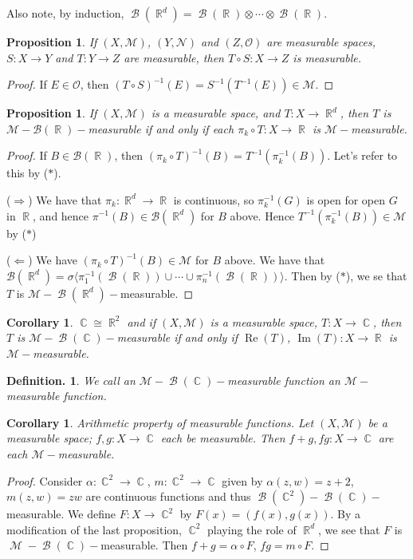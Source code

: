 \documentclass[12pt, a4paper]{memoir}
\DeclareMathOperator{\R}{{\mathbb{R}}}
\DeclareMathOperator{\C}{{\mathbb{C}}}
\newtheorem{corollary}[theorem]{Corollary}
\newtheorem{proposition}[theorem]{Proposition}
\theoremstyle{nonumberplain}
\newtheorem{definition}{Definition.}
\newtheorem{proof}{Proof}
\DeclareMathOperator{\M}{\mathcal{M}}
\DeclareMathOperator{\B}{\mathcal{B}}
\renewcommand{\Re}{\ensuremath{\operatorname{Re}}}
\renewcommand{\Im}{\ensuremath{\operatorname{Im}}}
\begin{document}
Also note, by induction, $\B(\R^d)=\B(\R)\otimes\cdots\otimes\B(\R)$.
\begin{proposition}
    If $(X,\mathcal{M})$, $(Y,\mathcal{N})$ and $(Z,\mathcal{O})$ are measurable spaces, $S:X\to Y$ and $T:Y\to Z$ are measurable, then $T\circ S:X\to Z$ is measurable.
\end{proposition}
\begin{proof}
    If $E\in\mathcal{O}$, then $(T\circ S)^{-1}(E)=S^{-1}(T^{-1}(E))\in\mathcal{M}$.
\end{proof}
\begin{proposition}
    If $(X,\mathcal{M})$ is a measurable space, and $T:X\to\R^d$, then $T$ is $\mathcal{M}-\mathcal{B}(\R)-$measurable if and only if each $\pi_k\circ T:X\to\R$ is $\mathcal{M}-$measurable.
\end{proposition}
\begin{proof}
    If $B\in\mathcal{B}(\R)$, then $(\pi_k\circ T)^{-1}(B)=T^{-1}(\pi_k^{-1}(B))$.
    Let's refer to this by ($*$).

    ($\Rightarrow$) We have that $\pi_k:\R^d\to\R$ is continuous, so $\pi_k^{-1}(G)$ is open for open $G$ in $\R$, and hence $\pi^{-1}(B)\in\mathcal{B}(\R^d)$ for $B$ above.
    Hence $T^{-1}(\pi_k^{-1}(B))\in\mathcal{M}$ by ($*$)

    ($\Leftarrow$) We have $(\pi_k\circ T)^{-1}(B)\in\mathcal{M}$ for $B$ above.
    We have that $\mathcal{B}(\R^d)=\sigma\langle\pi_1^{-1}(\B(\R))\cup\cdots\cup\pi_n^{-1}(\B(\R))\rangle$.
    Then by ($*$), we se that $T$ is $\mathcal{M}-\B(\R^d)-$measurable.
\end{proof}
\begin{corollary}
    $\C\cong\R^2$ and if $(X,\mathcal{M})$ is a measurable space, $T:X\to\C$, then $T$ is $\mathcal{M}-\B(\C)-$measurable if and only if $\Re(T)$, $\Im(T):X\to\R$ is $\mathcal{M}-$measurable.
\end{corollary}
\begin{definition}
    We call an $\mathcal{M}-\B(\C)-$measurable function an $\mathcal{M}-$measurable function.
\end{definition}
\begin{corollary}
    Arithmetic property of measurable functions.
    Let $(X,\mathcal{M})$ be a measurable space; $f,g:X\to\C$ each be measurable.
    Then $f+g,fg:X\to\C$ are each $\mathcal{M}-$measurable.
\end{corollary}
\begin{proof}
    Consider $\alpha:\C^2\to\C$, $m:\C^2\to\C$ given by $\alpha(z,w)=z+2$, $m(z,w)=zw$ are continuous functions and thus $\B(\C^2)-\B(\C)-$measurable.
    We define $F:X\to\C^2$ by $F(x)=(f(x),g(x))$.
    By a modification of the last proposition, $\C^2$ playing the role of $\R^d$, we see that $F$ is $\M-\B(\C)-$measurable.
    Then $f+g=\alpha\circ F$, $fg=m\circ F$.
\end{proof}
\end{document}
